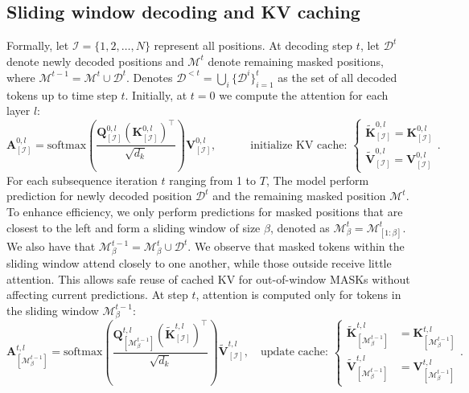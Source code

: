\documentclass{article} %
\theoremstyle{definition}
\theoremstyle{remark}
\begin{document}
\vspace{-0.05in}
\subsection{Sliding window decoding and KV caching}
Formally, let $\mathcal{I} = \{1, 2, \ldots, N\}$ represent all positions. At decoding step $t$, let $\mathcal{D}^t$ denote newly decoded positions and $\mathcal{M}^t$ denote remaining masked positions, where $\mathcal{M}^{t-1} = \mathcal{M}^{t} \cup \mathcal{D}^t$. Denotes $\mathcal{D}^{<t} = \bigcup_{i} \{\mathcal{D}^{i}\}_{i=1}^t$ as the set of all decoded tokens up to time step $t$. Initially, at $t=0$ we compute the attention for each layer $l$: 
\begin{equation}
\label{eq:update cache}
\mathbf{A}^{0,l}_{[\mathcal{I}]} = \text{softmax}\left(\frac{\mathbf{Q}^{0,l}_{[\mathcal{I}]}(\mathbf{K}^{0,l}_{[\mathcal{I}]})^\top}{\sqrt{d_k}}\right)\mathbf{V}^{0,l}_{[\mathcal{I}]},
\quad \quad \quad \text{initialize KV cache: } \left \{\begin{matrix}
\mathbf{\tilde K}^{0,l}_{[\mathcal{I}]} = \mathbf{K}^{0,l}_{[\mathcal{I}]} \\ \mathbf{\tilde V}^{0,l}_{[\mathcal{I}]} = \mathbf{V}^{0,l}_{[\mathcal{I}]}
\end{matrix} \right..
\end{equation}
For each subsequence iteration $t$ ranging from 1 to $T$, The model perform prediction for newly decoded position $\mathcal{D}^{t}$ and the remaining masked position $\mathcal{M}^{t}$. To enhance efficiency, we only perform predictions for masked positions that are closest to the left and form a sliding window of size $\beta$, denoted as $\mathcal{M}^{t}_{\beta} = \mathcal{M}^{t}_{[1:\beta]}$. We also have that $\mathcal{M}^{t-1}_{\beta} = \mathcal{M}^{t}_{\beta} \cup \mathcal{D}^{t}$. We observe that masked tokens within the sliding window attend closely to one another, while those outside receive little attention. This allows safe reuse of cached KV for out-of-window MASKs without affecting current predictions. At step $t$, attention is computed only for tokens in the sliding window $\mathcal{M}^{t-1}_\beta$:
\begin{equation}
\label{eq:kv cache}
\mathbf{A}^{t,l}_{[\mathcal{M}^{t-1}_{\beta}]} = \text{softmax}\left(\frac{\mathbf{Q}^{t,l}_{[ \mathcal{M}^{t-1}_\beta]}(\mathbf{\tilde K}^{t,l}_{[\mathcal{I}]})^\top}{\sqrt{d_k}}\right)\mathbf{\tilde V}^{t,l}_{[\mathcal{I}]}, \quad \text{update cache: } \left\{ \begin{matrix}
    \mathbf{\tilde K}^{t,l}_{[\mathcal{M}^{t-1}_\beta]} &= \mathbf{K}^{t,l}_{[\mathcal{M}^{t-1}_\beta]} \\
\mathbf{\tilde V}^{t,l}_{[\mathcal{M}^{t-1}_\beta]} &= \mathbf{V}^{t,l}_{[\mathcal{M}^{t-1}_\beta]}
\end{matrix} \right..
\end{equation}
\end{document}
